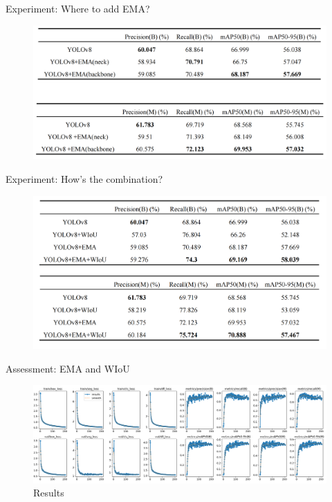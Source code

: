 \begin{frame}{Experiment: Where to add EMA?}
	\begin{figure}[h]
		\centering
		\includegraphics[width=\textwidth]{images/ema_add.png}
		\caption*{}
	\end{figure}
\end{frame}

\begin{frame}{Experiment: How's the combination?}
	\begin{figure}[h]
		\centering
		\includegraphics[width=\textwidth]{images/improve_combination.png}
		\caption*{}
	\end{figure}
\end{frame}

\begin{frame}{Assessment: EMA and WIoU}
	\begin{figure}[h]
		\centering
		\includegraphics[width=\textwidth]{images/loss_1.png}
		\caption{Results}
		\label{fig:loss1}
	\end{figure}
\end{frame}

